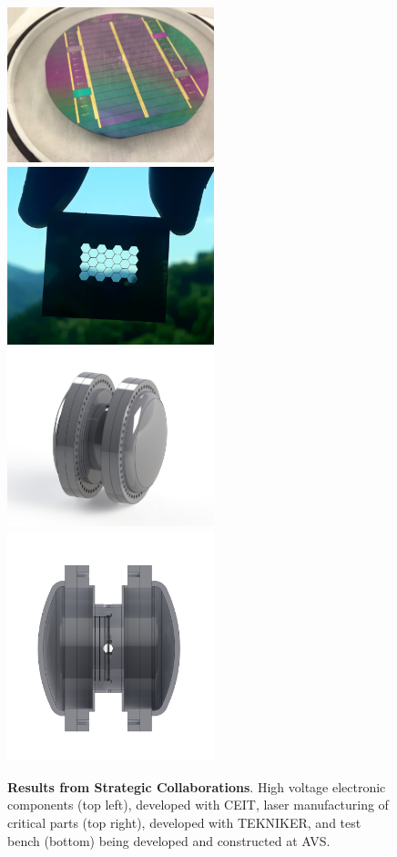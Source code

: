 \documentclass[12pt,a4paper,article]{report} %
\begin{document}
\begin{figure}[htbp]
\begin{center}
\includegraphics[width=6cm]{ceit} \hspace{1cm}\includegraphics[width=6cm]{tekniker}
\includegraphics[width=6cm]{avs1} \hspace{1cm}\includegraphics[width=6cm]{avs2}
\caption{\textbf{Results from Strategic Collaborations}. High voltage electronic components (top left), developed with CEIT, laser manufacturing of critical parts (top right), developed with TEKNIKER, and test bench (bottom) being developed and constructed at AVS.}
\label{collaborations}
\end{center}
\end{figure}
\end{document}
